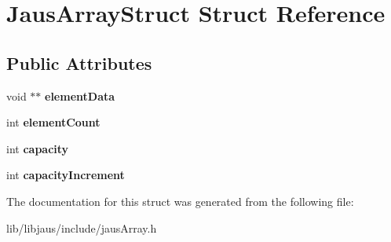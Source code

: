 \hypertarget{struct_jaus_array_struct}{\section{\-Jaus\-Array\-Struct \-Struct \-Reference}
\label{struct_jaus_array_struct}
}
\subsection*{\-Public \-Attributes}
\begin{DoxyCompactItemize}
\item 
\hypertarget{struct_jaus_array_struct_a728ead4fc43c0ebd6d6846b2362f810b}{void $\ast$$\ast$ {\bfseries element\-Data}}\label{struct_jaus_array_struct_a728ead4fc43c0ebd6d6846b2362f810b}

\item 
\hypertarget{struct_jaus_array_struct_a955631b744a1d940026e7bd402d4d14c}{int {\bfseries element\-Count}}\label{struct_jaus_array_struct_a955631b744a1d940026e7bd402d4d14c}

\item 
\hypertarget{struct_jaus_array_struct_a6105f9f55a448ddd583f99f2d2c61261}{int {\bfseries capacity}}\label{struct_jaus_array_struct_a6105f9f55a448ddd583f99f2d2c61261}

\item 
\hypertarget{struct_jaus_array_struct_a96f075a935dd60fc76a2e62f324ab357}{int {\bfseries capacity\-Increment}}\label{struct_jaus_array_struct_a96f075a935dd60fc76a2e62f324ab357}

\end{DoxyCompactItemize}


\-The documentation for this struct was generated from the following file\-:\begin{DoxyCompactItemize}
\item 
lib/libjaus/include/jaus\-Array.\-h\end{DoxyCompactItemize}
